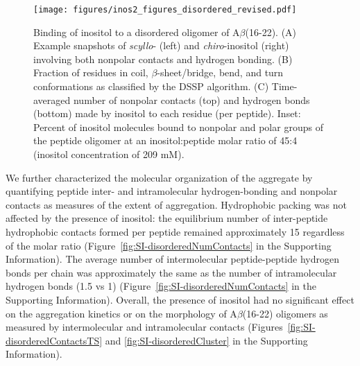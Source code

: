 \begin{figure}
\texttt{[image: figures/inos2\_figures\_disordered\_revised.pdf]}
\caption{Binding of inositol to a disordered oligomer of A$\beta$(16-22).  (A) Example snapshots of \emph{scyllo}- (left) and \emph{chiro}-inositol (right) involving both nonpolar contacts and hydrogen bonding. (B) Fraction of residues in coil, $\beta$-sheet/bridge, bend, and turn conformations as classified by the DSSP algorithm. (C) Time-averaged number of nonpolar contacts (top) and hydrogen bonds (bottom) made by inositol to each residue (per peptide). Inset: Percent of inositol molecules bound to nonpolar and polar groups of the peptide oligomer at an inositol:peptide molar ratio of 45:4 (inositol concentration of 209 mM).}
\label{fig:disordered}
\end{figure}

We further characterized the molecular organization of the aggregate by quantifying peptide inter- and intramolecular hydrogen-bonding and nonpolar contacts as measures of the extent of aggregation.  Hydrophobic packing was not affected by the presence of inositol: the equilibrium number of inter-peptide hydrophobic contacts formed per peptide remained approximately 15 regardless of the molar ratio (Figure~\ref{fig:SI-disorderedNumContacts} in the Supporting Information). The average number of intermolecular peptide-peptide hydrogen bonds per chain was approximately the same as the number of intramolecular hydrogen bonds (1.5 vs 1) (Figure~\ref{fig:SI-disorderedNumContacts} in the Supporting Information). Overall, the presence of inositol had no significant effect on the aggregation kinetics or on the morphology of A$\beta$(16-22) oligomers as measured by intermolecular and intramolecular contacts (Figures~\ref{fig:SI-disorderedContactsTS} and \ref{fig:SI-disorderedCluster} in the Supporting Information).

